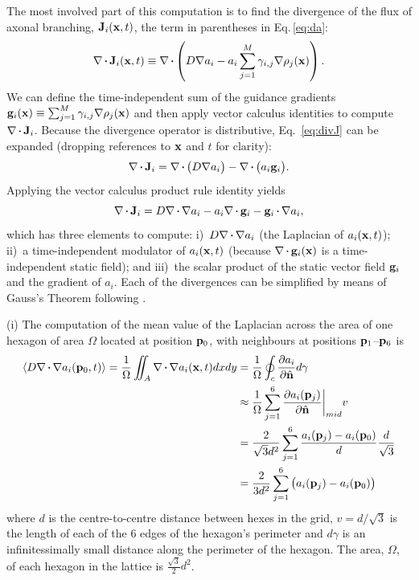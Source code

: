 \documentclass[9pt,lineno]{elife}
\begin{document}
The most involved part of this computation is to find the divergence of the
flux of axonal branching, $\mathbf{J}_i(\mathbf{x},t)$, the term in parentheses in
Eq.\,\ref{eq:da}:
%
\begin{equation}
  \label{eq:divJ}
  \nabla\vcdot\mb{J}_i(\mb{x},t) \equiv \nabla\vcdot\left(D \nabla a_i-a_i\sum_{j=1}^{M} \gamma_{i,j}\nabla \rho_j(\mb{x})\right).
\end{equation}
%
We can define the time-independent sum of the guidance gradients
$\mathbf{g}_i(\mathbf{x}) \equiv \sum_{j=1}^{M} \gamma_{i,j} \nabla \rho_j(\mathbf{x})$
and then apply vector calculus identities to compute
$\nabla\vcdot\mb{J}_i$. Because the divergence operator is distributive,
Eq.~\ref{eq:divJ} can be expanded (dropping references to $\mathbf{x}$ and $t$ for
clarity):
%
\begin{equation}
\nabla\vcdot\mb{J}_i = \nabla\vcdot\big(D \nabla a_i\big) - \nabla\vcdot\big(a_i \mb{g}_i\big).
\end{equation}
%
Applying the vector calculus product rule identity yields
%
\begin{equation} \label{eq:divJExpanded}
%
\nabla\vcdot\mb{J}_i =
%
D \dvrg a_i %
-
a_i\nabla\vcdot\mb{g}_i %
-
\mb{g}_i\vcdot\nabla a_i %
,
\end{equation}
%
which has three elements to compute: i)~$D \dvrg a_i$ (the Laplacian of
$a_i(\mathbf{x},t)$); ii)~a time-independent modulator of $a_i(\mathbf{x},t)$ (because
$\nabla\vcdot\mb{g}_i(\mb{x})$ is a time-independent static field); and iii)~the
scalar product of the static vector field $\mathbf{g}_i$ and the gradient of
$a_i$. Each of the divergences can be simplified by means of Gauss's Theorem
following \cite{lee_hexagonal_2014}.

(i) The computation of the mean value of the Laplacian across the area of one
hexagon of area $\Omega$ located at position $\mathbf{p}_0$, with neighbours at
positions $\mathbf{p}_1$--$\mathbf{p}_6$ is
%
\begin{equation} \label{eq:lapl}
\begin{split}
\langle D \dvrg a_i(\mb{p}_0,t) \rangle  = \frac{1}{\Omega} \iint_A \dvrg a_i(\mb{x}, t) dxdy & = \frac{1}{\Omega} \oint_c \frac{\partial a_i}{\partial \hat{\mb{n}}} d\gamma \\
& \approx \frac{1}{\Omega} \sum_{j=1}^6 \frac{\partial a_i(\mb{p}_j)}{\partial \hat{\mb{n}}} \bigg\rvert_{mid} v \\
& = \frac{2}{\sqrt{3} d^2} \sum_{j=1}^6 \frac{a_i(\mb{p}_j) - a_i(\mb{p}_0)}{d} \frac{d}{\sqrt{3}} \\
& = \frac{2}{3 d^2} \sum_{j=1}^6 \big(a_i(\mb{p}_j) - a_i(\mb{p}_0)\big)
\end{split}
\end{equation}
%
where $d$ is the centre-to-centre distance between hexes in the grid, $v =
d/\sqrt{3}$ is the length of each of the 6 edges of the hexagon's perimeter
and $d\gamma$ is an infinitessimally small distance along the perimeter of the
hexagon. The area, $\Omega$, of each hexagon in the lattice is
$\frac{\sqrt{3}}{2}d^2$.
\end{document}
